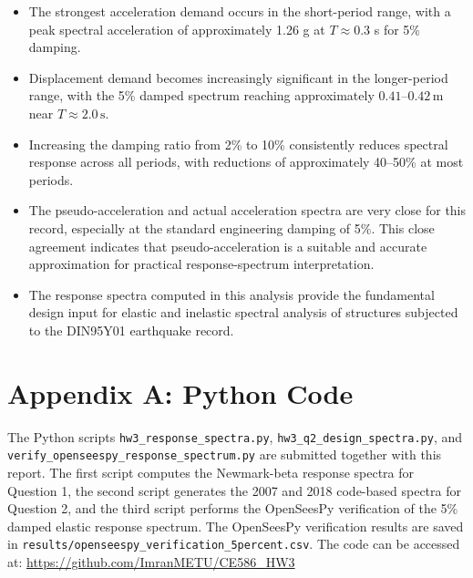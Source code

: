 ﻿\documentclass[12pt]{article}
\begin{document}
\begin{itemize}
    \item The strongest acceleration demand occurs in the short-period range, with a peak spectral acceleration of approximately 1.26 g at \(T \approx 0.3\) s for 5\% damping.
    
    \item Displacement demand becomes increasingly significant in the longer-period range, with the 5\% damped spectrum reaching approximately $0.41$--$0.42\,\mathrm{m}$ near $T\approx2.0\,\mathrm{s}$.
    
    \item Increasing the damping ratio from 2\% to 10\% consistently reduces spectral response across all periods, with reductions of approximately 40--50\% at most periods.
    
    \item The pseudo-acceleration and actual acceleration spectra are very close for this record, especially at the standard engineering damping of 5\%. This close agreement indicates that pseudo-acceleration is a suitable and accurate approximation for practical response-spectrum interpretation.
    
    \item The response spectra computed in this analysis provide the fundamental design input for elastic and inelastic spectral analysis of structures subjected to the DIN95Y01 earthquake record.
\end{itemize}

\section*{Appendix A: Python Code}

The Python scripts \texttt{hw3\_response\_spectra.py}, \texttt{hw3\_q2\_design\_spectra.py}, and \texttt{verify\_openseespy\_response\_spectrum.py} are submitted together with this report. The first script computes the Newmark-beta response spectra for Question 1, the second script generates the 2007 and 2018 code-based spectra for Question 2, and the third script performs the OpenSeesPy verification of the 5\% damped elastic response spectrum. The OpenSeesPy verification results are saved in \texttt{results/openseespy\_verification\_5percent.csv}.
The code can be accessed at: \url{https://github.com/ImranMETU/CE586_HW3}
\end{document}
